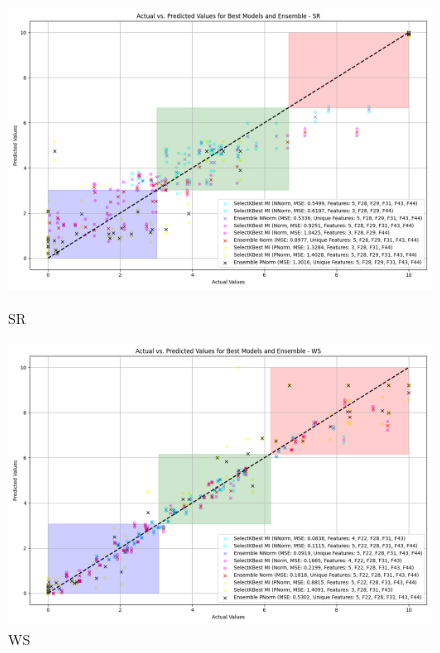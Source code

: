 \begin{figure}[H]
    \centering
    \begin{minipage}{0.45\textwidth}
        \centering
        \includegraphics[width=\linewidth]{reg_section_specific/featred_ensemble_learning/actual_vs_predicted_best_feature_selection_and_ensemble_SR_10.png}
        \caption{SR}
        \label{reg_spec_fig:sr_featred}
    \end{minipage}\hfill
    \begin{minipage}{0.45\textwidth}
        \centering
        \includegraphics[width=\linewidth]{reg_section_specific/featred_ensemble_learning/actual_vs_predicted_best_feature_selection_and_ensemble_WS_10.png}
        \caption{WS}
        \label{reg_spec_fig:ws_featred}
    \end{minipage}
\end{figure}

